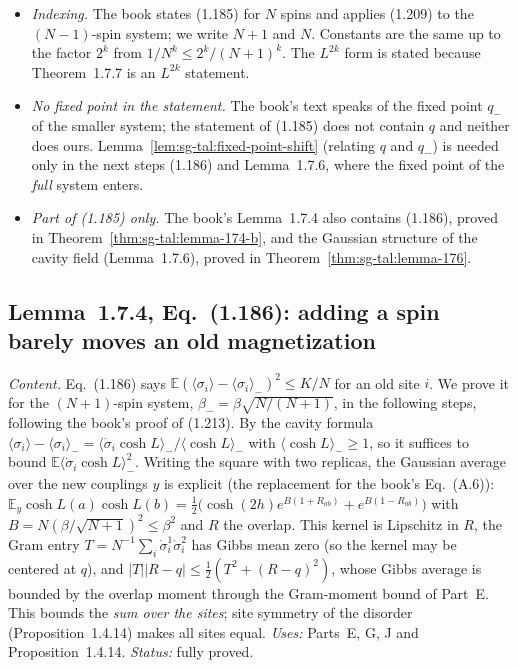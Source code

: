 \begin{remark}
\label{rem:sg-tal:dev-174}
\begin{itemize}
\item \emph{Indexing.}  The book states (1.185) for $N$ spins and applies (1.209) to the $(N-1)$-spin system; we write $N+1$ and $N$.  Constants are the same up to the factor $2^k$ from $1/N^k\le2^k/(N+1)^k$.  The $L^{2k}$ form is stated because Theorem~1.7.7 is an $L^{2k}$ statement.
\item \emph{No fixed point in the statement.}  The book's text speaks of the fixed point $q_-$ of the smaller system; the statement of (1.185) does not contain $q$ and neither does ours.  Lemma~\ref{lem:sg-tal:fixed-point-shift} (relating $q$ and $q_-$) is needed only in the next steps (1.186) and Lemma~1.7.6, where the fixed point of the \emph{full} system enters.
\item \emph{Part of (1.185) only.}  The book's Lemma~1.7.4 also contains (1.186), proved in Theorem~\ref{thm:sg-tal:lemma-174-b}, and the Gaussian structure of the cavity field (Lemma~1.7.6), proved in Theorem~\ref{thm:sg-tal:lemma-176}.
\end{itemize}
\end{remark}

\subsection{Lemma~1.7.4, Eq.~(1.186): adding a spin barely moves an old magnetization}
\label{sec:sg-tal:fluct-old-spin}

\emph{Content.}  Eq.~(1.186) says $\mathbb E(\langle\sigma_i\rangle-\langle\sigma_i\rangle_-)^2\le K/N$ for an old site $i$.  We prove it for the $(N+1)$-spin system, $\beta_-=\beta\sqrt{N/(N+1)}$, in the following steps, following the book's proof of (1.213).
By the cavity formula $\langle\sigma_i\rangle-\langle\sigma_i\rangle_-=\langle\dot\sigma_i\cosh L\rangle_-/\langle\cosh L\rangle_-$ with $\langle\cosh L\rangle_-\ge1$, so it suffices to bound $\mathbb E\langle\dot\sigma_i\cosh L\rangle_-^2$.
Writing the square with two replicas, the Gaussian average over the new couplings $y$ is explicit (the replacement for the book's Eq.~(A.6)): $\mathbb E_y\cosh L(a)\cosh L(b)=\tfrac12\bigl(\cosh(2h)e^{B(1+R_{ab})}+e^{B(1-R_{ab})}\bigr)$ with $B=N(\beta/\sqrt{N+1})^2\le\beta^2$ and $R$ the overlap.
This kernel is Lipschitz in $R$, the Gram entry $T=N^{-1}\sum_i\dot\sigma_i^1\dot\sigma_i^2$ has Gibbs mean zero (so the kernel may be centered at $q$), and $|T||R-q|\le\frac12(T^2+(R-q)^2)$, whose Gibbs average is bounded by the overlap moment through the Gram-moment bound of Part~E.
This bounds the \emph{sum over the sites}; site symmetry of the disorder (Proposition~1.4.14) makes all sites equal.
\emph{Uses:} Parts~E, G, J and Proposition~1.4.14.  \emph{Status:} fully proved.

